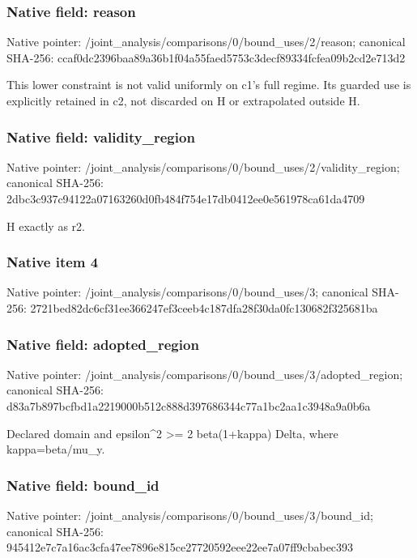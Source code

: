 \documentclass[10pt,a4paper]{article}
\begin{document}
\subsubsection{Native field: reason}
Native pointer: /joint\_\allowbreak{}analysis/comparisons/0/bound\_\allowbreak{}uses/2/reason; canonical SHA-256: ccaf0dc2396baa89a36b1f04a55faed5753c3decf89334fcfea09b2cd2e713d2

\begingroup\raggedright\sloppy This lower constraint is not valid uniformly on c1's full regime. Its guarded use is explicitly retained in c2,\allowbreak{} not discarded on H or extrapolated outside H.\par\endgroup

\subsubsection{Native field: validity\_\allowbreak{}region}
Native pointer: /joint\_\allowbreak{}analysis/comparisons/0/bound\_\allowbreak{}uses/2/validity\_\allowbreak{}region; canonical SHA-256: 2dbc3c937c94122a07163260d0fb484f754e17db0412ee0e561978ca61da4709

\begingroup\raggedright\sloppy H exactly as r2.\par\endgroup

\subsubsection{Native item 4}
Native pointer: /joint\_\allowbreak{}analysis/comparisons/0/bound\_\allowbreak{}uses/3; canonical SHA-256: 2721bed82dc6cf31ee366247ef3ceeb4c187dfa28f30da0fc130682f325681ba

\subsubsection{Native field: adopted\_\allowbreak{}region}
Native pointer: /joint\_\allowbreak{}analysis/comparisons/0/bound\_\allowbreak{}uses/3/adopted\_\allowbreak{}region; canonical SHA-256: d83a7b897bcfbd1a2219000b512c888d397686344c77a1bc2aa1c3948a9a0b6a

\begingroup\raggedright\sloppy Declared domain and epsilon\textasciicircum{}2 >=\allowbreak{} 2 beta(1+kappa) Delta,\allowbreak{} where kappa=\allowbreak{}beta/\allowbreak{}mu\_\allowbreak{}y.\par\endgroup

\subsubsection{Native field: bound\_\allowbreak{}id}
Native pointer: /joint\_\allowbreak{}analysis/comparisons/0/bound\_\allowbreak{}uses/3/bound\_\allowbreak{}id; canonical SHA-256: 945412e7c7a16ac3cfa47ee7896e815ce27720592eee22ee7a07ff9cbabec393
\end{document}
